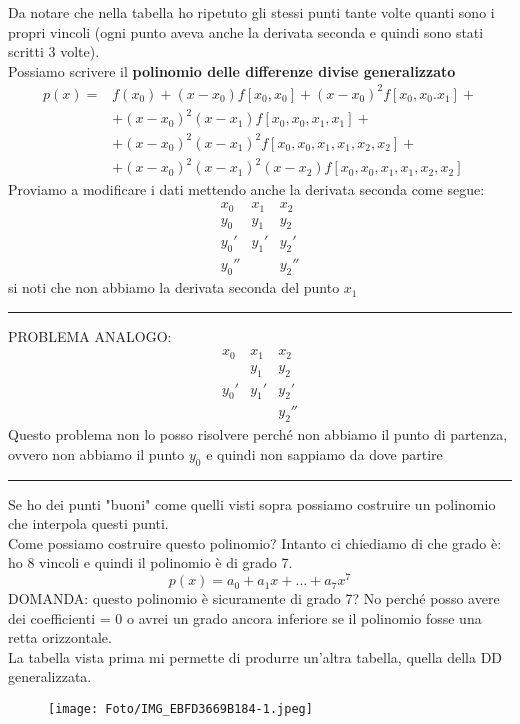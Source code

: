 \documentclass[a4paper, portrait]{book}
\numberwithin{equation}{chapter} %
\newcommand*\sepline{%
  \begin{center}
    \rule[1ex]{.5\textwidth}{.5pt}
  \end{center}}
\begin{document}
Da notare che nella tabella ho ripetuto gli stessi punti tante volte quanti sono i propri vincoli (ogni punto aveva anche la derivata seconda e quindi sono stati scritti 3 volte).\\
Possiamo scrivere il \textbf{polinomio delle differenze divise generalizzato}
\begin{align*}
    p(x) = &f(x_0) + (x-x_0)f[x_0,x_0]+(x-x_0)^2 f[x_0,x_0.x_1] +\\
    &+(x-x_0)^2(x-x_1)f[x_0,x_0,x_1,x_1]+\\
    &+(x-x_0)^2(x-x_1)^2f[x_0,x_0,x_1,x_1,x_2,x_2] +\\
    &+(x-x_0)^2(x-x_1)^2(x-x_2)f[x_0,x_0,x_1,x_1,x_2,x_2]
\end{align*}
Proviamo a modificare i dati mettendo anche la derivata seconda come segue:
$$\begin{matrix}
    x_0&x_1&x_2\\
    y_0&y_1&y_2\\
    y_0'&y_1'&y_2'\\
    y_0''&&y_2''
\end{matrix}$$
si noti che non abbiamo la derivata seconda del punto $x_1$
\sepline{}
PROBLEMA ANALOGO:
$$\begin{matrix}
    x_0&x_1&x_2\\
    &y_1&y_2\\
    y_0'&y_1'&y_2'\\
    &&y_2''
\end{matrix}$$
Questo problema non lo posso risolvere perché non abbiamo il punto di partenza, ovvero non abbiamo il punto $y_0$ e quindi non sappiamo da dove partire
\sepline{}
Se ho dei punti "buoni" come quelli visti sopra possiamo costruire un polinomio che interpola questi punti.\\
Come possiamo costruire questo polinomio? Intanto ci chiediamo di che grado è: ho 8 vincoli e quindi il polinomio è di grado 7.\\
\begin{equation}
    p(x) = a_0 + a_1 x + ... + a_7 x^7
\end{equation}
DOMANDA: questo polinomio è sicuramente di grado 7? No perché posso avere dei coefficienti = 0 o avrei un grado ancora inferiore se il polinomio fosse una retta orizzontale.\\
La tabella vista prima mi permette di produrre un'altra tabella, quella della DD generalizzata.
\begin{figure}[h!]
    \centering
    \texttt{[image: Foto/IMG\_EBFD3669B184-1.jpeg]}
    \caption{}
\end{figure}
\end{document}

